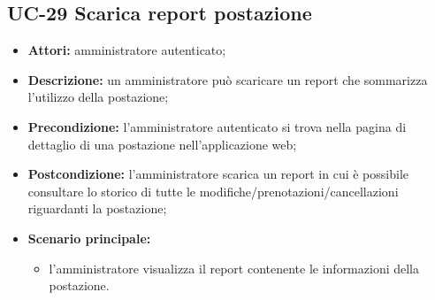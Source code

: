 \subsection{UC-29 Scarica report postazione}
\begin{itemize}
    \item \textbf{Attori:} amministratore autenticato;
    \item \textbf{Descrizione:} un amministratore pu\`{o} scaricare un report che sommarizza l'utilizzo della postazione;
    \item \textbf{Precondizione:} l'amministratore autenticato si trova nella pagina di dettaglio di una postazione nell'applicazione web;
    \item \textbf{Postcondizione:} l'amministratore scarica un report in cui \`{e} possibile consultare lo storico di tutte le modifiche/prenotazioni/cancellazioni riguardanti la postazione;
    \item \textbf{Scenario principale:}
    \begin{itemize}
        \item l'amministratore visualizza il report contenente le informazioni della postazione.
    \end{itemize}
\end{itemize}